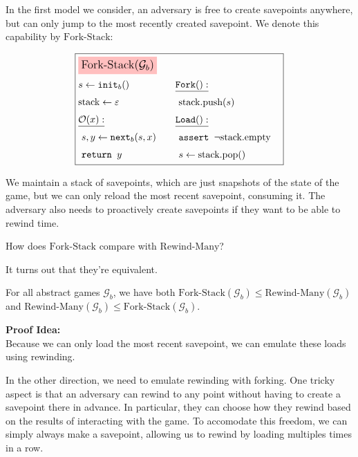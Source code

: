 In the first model we consider, an adversary is free to create savepoints
anywhere, but can only jump to the most recently created savepoint.
We denote this capability by $\text{Fork-Stack}$:

\begin{game}
\captionsetup{justification=centering}
$$
\boxed{
\begin{aligned}
&\colorbox{pink}{\large $\text{Fork-Stack}(\mathcal{G}_b)$}\cr
&\begin{aligned}
    &s \gets \texttt{init}_b()\cr
    &\text{stack} \gets \varepsilon\cr
    &\underline{\mathcal{O}(x):}\cr
    &\ s, y \gets \texttt{next}_b(s, x)\cr
    &\ \texttt{return } y\cr
\end{aligned}
&\begin{aligned}
    &\underline{\texttt{Fork}():}\cr
    &\ \text{stack}.\text{push}(s)\cr
    &\underline{\texttt{Load}():}\cr
    &\ \texttt{assert } \neg \text{stack}.\text{empty}\cr
    &\ s \gets \text{stack}.\text{pop}()\cr
\end{aligned}\cr
\end{aligned}
}
$$
\caption{$\text{Fork-Stack}(\mathcal{G}_b)$}
\end{game}

We maintain a stack of savepoints, which are just snapshots of the state
of the game, but we can only reload the most recent savepoint, consuming
it.
The adversary also needs to proactively create savepoints if they want to be able
to rewind time.

How does $\text{Fork-Stack}$ compare with $\text{Rewind-Many}$?

It turns out that they're equivalent.

\begin{claim}
    \label{claim:fork-stack-is-not-stronger}
    For all abstract games $\mathcal{G}_b$, we have both
    $\text{Fork-Stack}(\mathcal{G}_b) \leq \text{Rewind-Many}(\mathcal{G}_b)$
    and $\text{Rewind-Many}(\mathcal{G}_b) \leq \text{Fork-Stack}(\mathcal{G}_b)$.
\end{claim}

\textbf{Proof Idea:}\\
Because we can only load the most recent savepoint, we can emulate
these loads using rewinding.

In the other direction, we need to emulate rewinding with forking.
One tricky aspect is that an adversary can rewind to any point without
having to create a savepoint there in advance.
In particular, they can choose how they rewind based on the results
of interacting with the game.
To accomodate this freedom, we can simply always make a savepoint,
allowing us to rewind by loading multiples times in a row.

